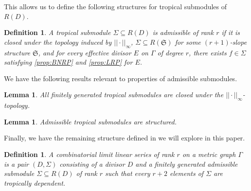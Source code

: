 \documentclass{amsart}
\newtheorem{lemma}[theorem]{Lemma}
\newtheorem{definition}[theorem]{Definition}
\begin{document}
	This allows us to define the following structures for tropical submodules of $R(D)$.
	
	\begin{definition}\cite{amini2022limit}
		A tropical submodule $\Sigma \subseteq R(D)$ is admissible of rank $r$ if it is closed under the topology induced by $||\cdot||_{\infty}$, $\Sigma \subseteq R(\mathfrak{S})$ for some $(r+1)$-slope structure $\mathfrak{S}$, and for every effective divisor $E$ on $\Gamma$ of degree $r$, there exists $f \in \Sigma$ satisfying \ref{prop:BNRP} and \ref{prop:LRP} for $E$.
	\end{definition}
	
	We have the following results relevant to properties of admissible submodules.
	
	\begin{lemma}\cite[Proposition~5.5]{amini2022limit}
		\label{Lem:TLS-top-closed}
		All finitely generated tropical submodules are closed under the $||\cdot||_{\infty}$-topology.
	\end{lemma}
	
	\begin{lemma}\cite[Theorem~5.8]{amini2022limit}
		\label{Lem:Admissible-implies-structured}
		Admissible tropical submodules are structured.
	\end{lemma}
	
	Finally, we have the remaining structure defined in \cite{amini2022limit} we will explore in this paper.
	
	\begin{definition}\cite[Definitions~6.2]{amini2022limit}
		\label{Def:CLLS}
		A combinatorial limit linear series of rank $r$ on a metric graph $\Gamma$ is a pair $(D, \Sigma)$ consisting of a divisor $D$ and a finitely generated admissible submodule $\Sigma \subseteq R(D)$ of rank $r$ such that every $r+2$ elements of $\Sigma$ are tropically dependent.
	\end{definition}
	
\end{document}
